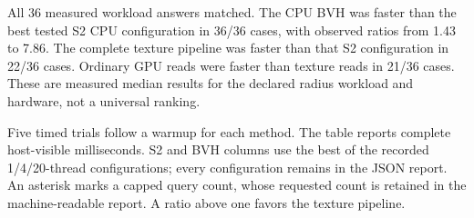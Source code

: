 \begin{panel}
All 36 measured workload answers matched. The CPU BVH was faster than
the best tested S2 CPU configuration in 36/36 cases, with observed
ratios from 1.43 to 7.86. The complete texture pipeline was
faster than that S2 configuration in 22/36 cases. Ordinary GPU reads
were faster than texture reads in 21/36 cases. These are measured median
results for the declared radius workload and hardware, not a universal ranking.
\end{panel}
Five timed trials follow a warmup for each method. The table reports complete
host-visible milliseconds. S2 and BVH columns use the best of the recorded
1/4/20-thread configurations; every configuration remains in the JSON report.
An asterisk marks a capped query count, whose requested count is retained in
the machine-readable report. A ratio above one favors the texture pipeline.
